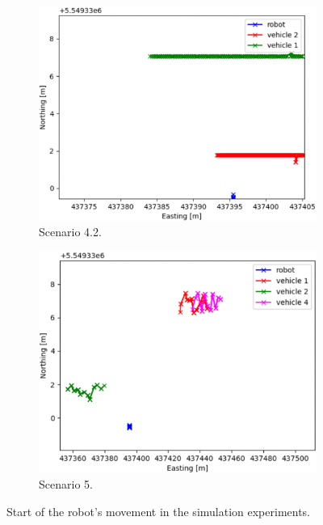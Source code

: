 \begin{figure}[H]
            \begin{subfigure}{0.32\linewidth}
                \centering
                \includegraphics[width=\linewidth]{images/simulations/start_4_2.png}
                \caption{Scenario 4.2.}
            \end{subfigure}
            \begin{subfigure}{0.32\linewidth}
                \centering
                \includegraphics[width=\linewidth]{images/simulations/start_5.png}
                \caption{Scenario 5.}
            \end{subfigure}
            \caption{Start of the robot's movement in the simulation experiments.}
        \end{figure}
